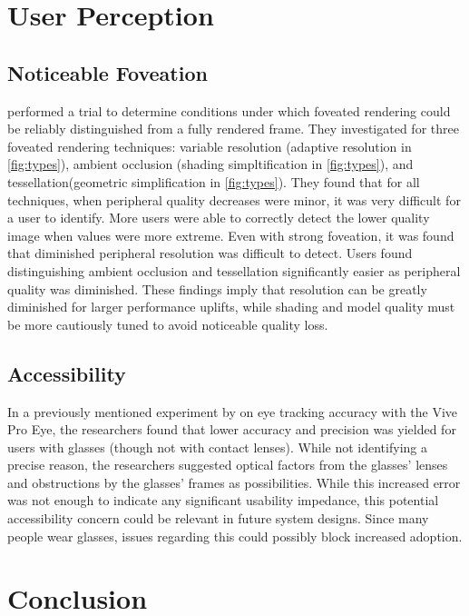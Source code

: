 \documentclass[a4paper,11pt]{article}
\begin{document}
\section{User Perception}
\subsection{Noticeable Foveation}
\textcite{swafford2016user} performed a trial to determine conditions under which foveated rendering could be reliably distinguished from a fully rendered frame. They investigated for three foveated rendering techniques: variable resolution (adaptive resolution in \cref{fig:types}), ambient occlusion (shading simpltification in \cref{fig:types}), and tessellation(geometric simplification in \cref{fig:types}). They found that for all techniques, when peripheral quality decreases were minor, it was very difficult for a user to identify. More users were able to correctly detect the lower quality image when values were more extreme. Even with strong foveation, it was found that diminished peripheral resolution was difficult to detect. Users found distinguishing ambient occlusion and tessellation significantly easier as peripheral quality was diminished. These findings imply that resolution can be greatly diminished for larger performance uplifts, while shading and model quality must be more cautiously tuned to avoid noticeable quality loss.

\subsection{Accessibility}
In a previously mentioned experiment by \textcite{schuetz2022eye} on eye tracking accuracy with the Vive Pro Eye, the researchers found that lower accuracy and precision was yielded for users with glasses (though not with contact lenses). While not identifying a precise reason, the researchers suggested optical factors from the glasses' lenses and obstructions by the glasses' frames as possibilities. While this increased error was not enough to indicate any significant usability impedance, this potential accessibility concern could be relevant in future system designs. Since many people wear glasses, issues regarding this could possibly block increased adoption.

\section{Conclusion}

\printbibliography
\end{document}
